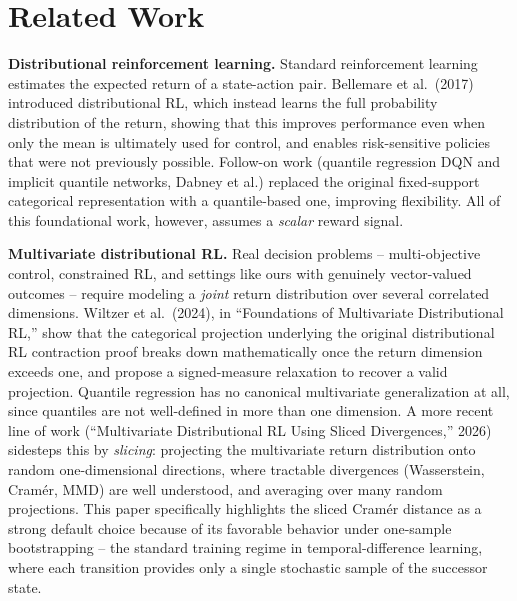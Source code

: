\documentclass[11pt]{article}
\begin{document}
\section{Related Work}
\label{sec:related-work}

\textbf{Distributional reinforcement learning.} Standard reinforcement learning estimates the expected return of a state-action pair. Bellemare et al.\ (2017) introduced distributional RL, which instead learns the full probability distribution of the return, showing that this improves performance even when only the mean is ultimately used for control, and enables risk-sensitive policies that were not previously possible. Follow-on work (quantile regression DQN and implicit quantile networks, Dabney et al.) replaced the original fixed-support categorical representation with a quantile-based one, improving flexibility. All of this foundational work, however, assumes a \emph{scalar} reward signal.

\textbf{Multivariate distributional RL.} Real decision problems -- multi-objective control, constrained RL, and settings like ours with genuinely vector-valued outcomes -- require modeling a \emph{joint} return distribution over several correlated dimensions. Wiltzer et al.\ (2024), in ``Foundations of Multivariate Distributional RL,'' show that the categorical projection underlying the original distributional RL contraction proof breaks down mathematically once the return dimension exceeds one, and propose a signed-measure relaxation to recover a valid projection. Quantile regression has no canonical multivariate generalization at all, since quantiles are not well-defined in more than one dimension. A more recent line of work (``Multivariate Distributional RL Using Sliced Divergences,'' 2026) sidesteps this by \emph{slicing}: projecting the multivariate return distribution onto random one-dimensional directions, where tractable divergences (Wasserstein, Cram\'er, MMD) are well understood, and averaging over many random projections. This paper specifically highlights the sliced Cram\'er distance as a strong default choice because of its favorable behavior under one-sample bootstrapping -- the standard training regime in temporal-difference learning, where each transition provides only a single stochastic sample of the successor state.
\end{document}
